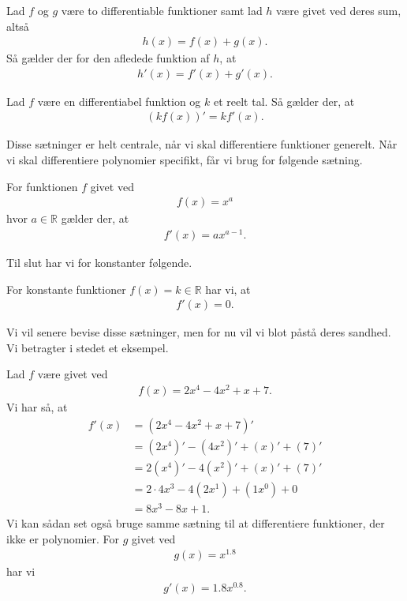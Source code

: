 \begin{setn}
	Lad $f$ og $g$ være to differentiable funktioner samt lad $h$ være givet ved deres sum, altså
	\begin{align*}
		h(x) = f(x) + g(x).
	\end{align*}
	Så gælder der for den afledede funktion af $h$, at 
	\begin{align*}
		h'(x) = f'(x) + g'(x).
	\end{align*}
\end{setn}
\begin{setn}
	Lad $f$ være en differentiabel funktion og $k$ et reelt tal. Så gælder der, at 
	\begin{align*}
		(kf(x))' = kf'(x).
	\end{align*}
\end{setn}
\newpage
Disse sætninger er helt centrale, når vi skal differentiere funktioner generelt. Når vi skal differentiere polynomier specifikt, får vi brug for følgende sætning.
\begin{setn}\label{setn:potens}
	For funktionen $f$ givet ved
	\begin{align*}
		f(x) = x^a
	\end{align*}
	hvor $a \in \mathbb{R}$ gælder der, at 
	\begin{align*}
		f'(x) = ax^{a-1}.
	\end{align*}
\end{setn}
Til slut har vi for konstanter følgende.
\begin{setn}
	For konstante funktioner $f(x) = k\in \mathbb{R}$ har vi, at 
	\begin{align*}
		f'(x) = 0.
	\end{align*}
\end{setn}
Vi vil senere bevise disse sætninger, men for nu vil vi blot påstå deres sandhed. Vi betragter i stedet et eksempel.
\begin{exa}
	Lad $f$ være givet ved
	\begin{align*}
		f(x) = 2x^4 -4x^2 + x + 7.
	\end{align*}
	Vi har så, at 
	\begin{align*}
		f'(x) &= (2x^4-4x^2+x+7)' \\
		&= (2x^4)' - (4x^2)' + (x)' + (7)' \\
		&= 2(x^4)' - 4(x^2)' + (x)' + (7)' \\
		&= 2\cdot 4x^{3} - 4(2x^{1}) + (1x^{0}) + 0 \\
		&= 8x^3 -8x + 1.
	\end{align*}
	Vi kan sådan set også bruge samme sætning til at differentiere funktioner, der ikke er polynomier. For $g$
	givet ved
	\begin{align*}
		g(x) = x^{1.8}
	\end{align*}
	har vi 
	\begin{align*}
		g'(x) = 1.8x^{0.8}.
	\end{align*}
\end{exa}
